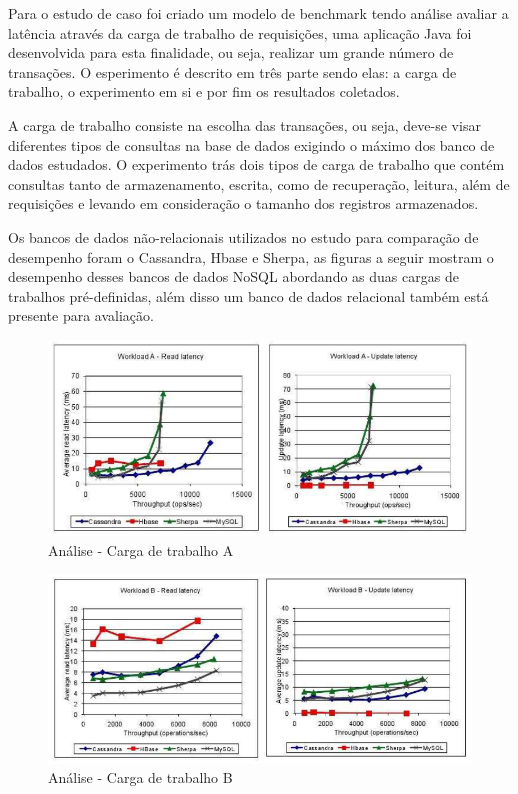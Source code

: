 \documentclass[12pt]{article}
\begin{document}
Para o estudo de caso foi criado um modelo de benchmark tendo análise avaliar a latência através da carga de trabalho de requisições, uma aplicação Java foi desenvolvida para esta finalidade, ou seja, realizar um grande número de transações. O esperimento é descrito em três parte sendo elas: a carga de trabalho, o experimento em si e por fim os resultados coletados.

A carga de trabalho consiste na escolha das transações, ou seja, deve-se visar diferentes tipos de consultas na base de dados exigindo o máximo dos banco de dados estudados. O experimento trás dois tipos de carga de trabalho que contém consultas tanto de armazenamento, escrita, como de recuperação, leitura, além de requisições e levando em consideração o tamanho dos registros armazenados.

Os bancos de dados não-relacionais utilizados no estudo para comparação de desempenho foram o Cassandra, Hbase e Sherpa, as figuras a seguir mostram o desempenho desses bancos de dados NoSQL abordando as duas cargas de trabalhos pré-definidas, além disso um banco de dados relacional também está presente para avaliação.

\begin{figure}[ht]
	\centering
	\includegraphics[width=.9\textwidth]{img/cargaA.png}
	\caption{Análise - Carga de trabalho A}
	\label{img:cargaA}
\end{figure}

\begin{figure}[ht]
	\centering
	\includegraphics[width=.9\textwidth]{img/cargaB.png}
	\caption{Análise - Carga de trabalho B}
	\label{img:cargaB}
\end{figure}
\end{document}
